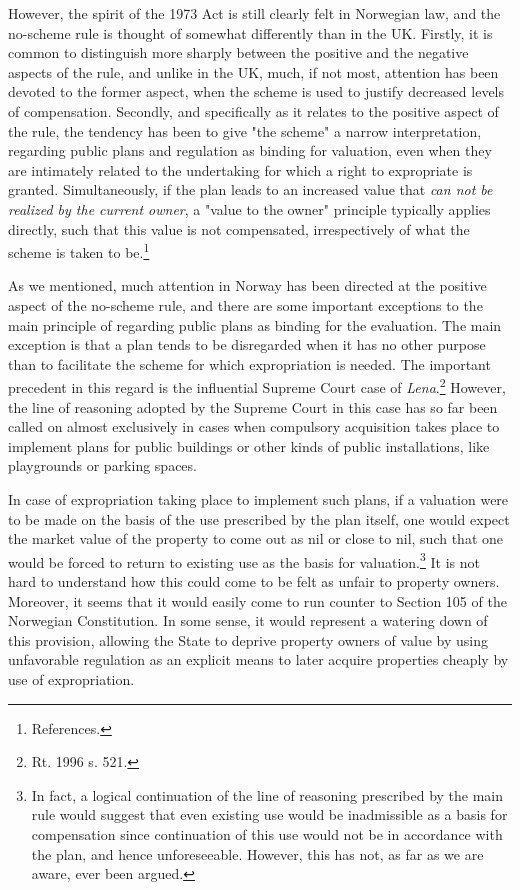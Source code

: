 However, the spirit of the 1973 Act is still clearly felt in Norwegian law, and the no-scheme rule is thought of somewhat differently than in the UK. Firstly, it is common to distinguish more sharply between the positive and the negative aspects of the rule, and unlike in the UK, much, if not most, attention has been devoted to the former aspect, when the scheme is used to justify decreased levels of compensation. Secondly, and specifically as it relates to the positive aspect of the rule, the tendency has been to give "the scheme" a narrow interpretation, regarding public plans and regulation as binding for valuation, even when they are intimately related to the undertaking for which a right to expropriate is granted. Simultaneously, if the plan leads to an increased value that \emph{can not be realized by the current owner}, a "value to the owner" principle typically applies directly, such that this value is not compensated, irrespectively of what the scheme is taken to be.\footnote{References.}

As we mentioned, much attention in Norway has been directed at the positive aspect of the no-scheme rule, and there are some important exceptions to the main principle of regarding public plans as binding for the evaluation. The main exception is that a plan tends to be disregarded when it has no other purpose than to facilitate the scheme for which expropriation is needed. The important precedent in this regard is the influential Supreme Court case of \emph{Lena}.\footnote{Rt. 1996 s. 521.} However, the line of reasoning adopted by the Supreme Court in this case has so far been called on almost exclusively in cases when compulsory acquisition takes place to implement plans for public buildings or other kinds of public installations, like playgrounds or parking spaces.

In case of expropriation taking place to implement such plans, if a valuation were to be made on the basis of the use prescribed by the plan itself, one would expect the market value of the property to come out as nil or close to nil, such that one would be forced to return to existing use as the basis for valuation.\footnote{In fact, a logical continuation of the line of reasoning prescribed by the main rule would suggest that even existing use would be inadmissible as a basis for compensation since continuation of this use would not be in accordance with the plan, and hence unforeseeable. However, this has not, as far as we are aware, ever been argued.} It is not hard to understand how this could come to be felt as unfair to property owners. Moreover, it seems that it would easily come to run counter to Section 105 of the Norwegian Constitution. In some sense, it would represent a watering down of this provision, allowing the State to deprive property owners of value by using unfavorable regulation as an explicit means to later acquire properties cheaply by use of expropriation.

